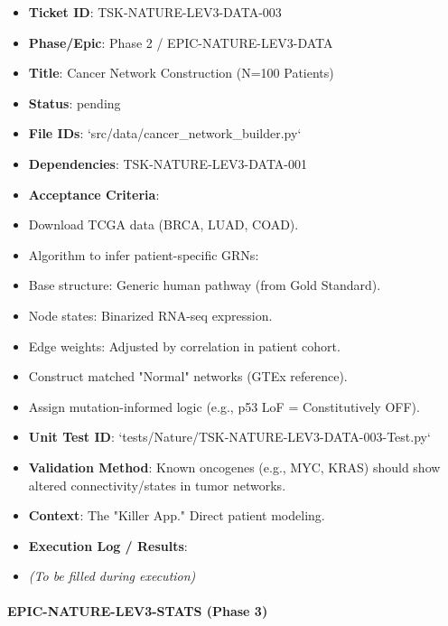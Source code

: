 \documentclass{article}
\begin{document}
\begin{itemize}
\item   \textbf{Ticket ID}: TSK-NATURE-LEV3-DATA-003
\item   \textbf{Phase/Epic}: Phase 2 / EPIC-NATURE-LEV3-DATA
\item   \textbf{Title}: Cancer Network Construction (N=100 Patients)
\item   \textbf{Status}: pending
\item   \textbf{File IDs}: `src/data/cancer\_network\_builder.py`
\item   \textbf{Dependencies}: TSK-NATURE-LEV3-DATA-001
\item   \textbf{Acceptance Criteria}:
\item   Download TCGA data (BRCA, LUAD, COAD).
\item   Algorithm to infer patient-specific GRNs:
\item   Base structure: Generic human pathway (from Gold Standard).
\item   Node states: Binarized RNA-seq expression.
\item   Edge weights: Adjusted by correlation in patient cohort.
\item   Construct matched "Normal" networks (GTEx reference).
\item   Assign mutation-informed logic (e.g., p53 LoF = Constitutively OFF).
\item   \textbf{Unit Test ID}: `tests/Nature/TSK-NATURE-LEV3-DATA-003-Test.py`
\item   \textbf{Validation Method}: Known oncogenes (e.g., MYC, KRAS) should show altered connectivity/states in tumor networks.
\item   \textbf{Context}: The "Killer App." Direct patient modeling.
\item   \textbf{Execution Log / Results}:
\item   \textit{(To be filled during execution)}
\end{itemize}

\paragraph{EPIC-NATURE-LEV3-STATS (Phase 3)}
\end{document}
